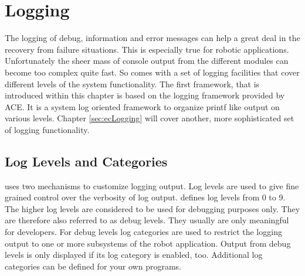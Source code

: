 \chapter{Logging}
\label{sec:logging}

The logging of debug, information and error messages can help a great
deal in the recovery from failure situations. This is especially true
for robotic applications. Unfortunately the sheer mass of console
output from the different modules can become too complex quite fast. So
\miro comes with a set of logging facilities that cover different
levels of the system functionality. The first framework, that is
introduced within this chapter is based on the logging framework
provided by ACE. It is a system log oriented framework to organize printf
like output on various levels. Chapter \ref{sec:ecLogging} will cover
another, more sophisticated set of logging functionality.

\section{Log Levels and Categories}

\miro uses two mechanisms to customize logging output.  Log levels are
used to give fine grained control over the verbosity of log output.
\miro defines log levels from 0 to 9. The higher log levels are
considered to be used for debugging purposes only. They are therefore
also referred to as debug levels. They usually are only meaningful for
developers. For debug levels log categories 
are used to restrict the logging output to one or more subsystems of
the robot application. Output from debug levels is only displayed if
its log category is enabled, too.
Additional log categories can be defined for your own
programs.

